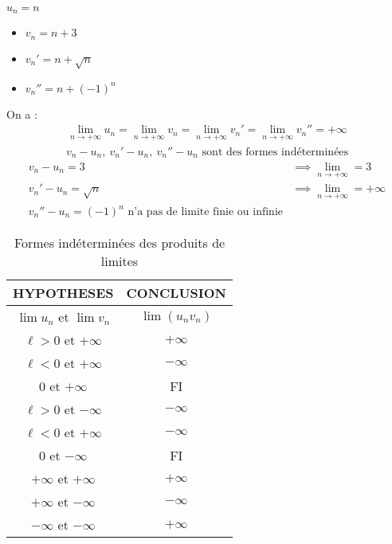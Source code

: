 \begin{exemple}
$u_n = n$
\begin{itemize}
    \item $v_n = n + 3$ 
    \item $v_n' = n + \sqrt{n}$
    \item $v_n'' = n + (-1)^{n}$
\end{itemize}
On a :
\begin{align*}
    \lim_{n \to +\infty} u_n = \lim_{n \to +\infty} v_n = \lim_{n \to +\infty} v_n' = \lim_{n \to +\infty} v_n'' = +\infty
\end{align*}
\begin{align*}
    v_n - u_n, \ v_n' - u_n, \ v_n'' - u_n \text{ sont des formes indéterminées}
\end{align*}
\begin{align*}
    v_n - u_n = 3 &\implies \lim_{n \to +\infty} = 3 \\
    v_n' - u_n = \sqrt{n} &\implies \lim_{n \to +\infty} = +\infty \\
    v_n'' -u_n = (-1)^n \text{ n'a pas de limite finie ou infinie}
\end{align*}
\end{exemple}

\begin{remarque}
    \begin{table}[!h]
        \centering
        \begin{tabular}{cc}
            HYPOTHESES & CONCLUSION \\
            \hline
            $\lim u_n$ et $\lim v_n$ & $\lim (u_n v_n)$ \\
            $\ell > 0$ et $+\infty$ & $+\infty$ \\
            $\ell < 0$ et $+\infty$ & $-\infty$ \\
            $0$ et $+\infty$ & FI \\
            $\ell > 0$ et $-\infty$ & $-\infty$ \\
            $\ell < 0$ et $+\infty$ & $-\infty$ \\
            $0$ et $-\infty$ & FI \\
            $+\infty$ et $+\infty$ & $+\infty$ \\
            $+\infty$ et $-\infty$ & $-\infty$ \\
            $-\infty$ et $-\infty$ & $+\infty$ \\
            \hline
        \end{tabular}
        \caption{Formes indéterminées des produits de limites}
    \end{table}
\end{remarque}

